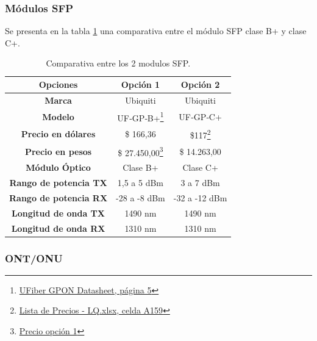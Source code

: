 \documentclass[11pt,a4paper]{article}
\begin{document}
\subsubsection{Módulos SFP}
Se presenta en la tabla \ref{tab:comp_sfp} una comparativa entre el módulo SFP clase B+ y clase C+.
\begin{table}[htbp]
  \centering
\begin{tabular}{|c|c|c|} \hline 
\textbf{Opciones} & \textbf{Opción 1} & \textbf{Opción 2} \\ \hline 
\textbf{Marca} & Ubiquiti & Ubiquiti \\ \hline 
\textbf{Modelo} & UF‑GP‑B+\footnote{\href{}{UFiber GPON Datasheet, página 5}} & UF‑GP‑C+ \\ \hline 
\textbf{Precio en dólares} & \$ 166,36 & \$117\footnote{\href{}{Lista de Precios - LQ.xlsx, celda A159}} \\ \hline 
\textbf{Precio en pesos} & \$ 27.450,00\footnote{\href{}{Precio opción 1}} & \$ 14.263,00 \\ \hline 
\textbf{Módulo Óptico} & Clase B+ & Clase C+ \\ \hline 
\textbf{Rango de potencia TX} & 1,5 a 5 dBm & 3 a 7 dBm \\ \hline 
\textbf{Rango de potencia RX} & -28 a -8 dBm & -32 a -12 dBm \\ \hline 
\textbf{Longitud de onda TX} & 1490 nm & 1490 nm \\ \hline 
\textbf{Longitud de onda RX} & 1310 nm & 1310 nm \\ \hline 
\end{tabular}
\caption{Comparativa entre los 2 modulos SFP.}
\label{tab:comp_sfp}
\end{table}


\subsubsection{ONT/ONU}
\end{document}
